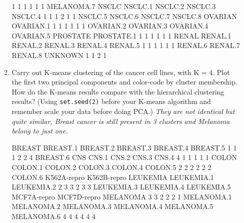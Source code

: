 \documentclass[12pt,a4paper]{paper}
\begin{document}
\begin{enumerate}
\begin{enumerate}
\begin{Schunk}
\begin{Soutput}
          1           1           1           1           1           1 
 MELANOMA.7       NSCLC     NSCLC.1     NSCLC.2     NSCLC.3     NSCLC.4 
          1           1           1           2           1           1 
    NSCLC.5     NSCLC.6     NSCLC.7     NSCLC.8     OVARIAN   OVARIAN.1 
          1           1           1           1           1           1 
  OVARIAN.2   OVARIAN.3   OVARIAN.4   OVARIAN.5    PROSTATE  PROSTATE.1 
          1           1           1           1           1           1 
      RENAL     RENAL.1     RENAL.2     RENAL.3     RENAL.4     RENAL.5 
          1           1           1           1           1           1 
    RENAL.6     RENAL.7     RENAL.8     UNKNOWN 
          1           1           2           1 
\end{Soutput}
\end{Schunk}
\item Carry out K-means clustering of the cancer cell lines, with K = 4. Plot the first two principal components and color-code by cluster membership. How do the K-means results compare with the hierarchical clustering results? (Using \texttt{set.seed(2)} before your K-means algorithm and remember scale your data before doing PCA.) \textit{They are not identical but quite similar, Breast cancer is still present in 3 clusters and Melanoma belong to just one.}
\begin{Schunk}
\begin{Soutput}
     BREAST    BREAST.1    BREAST.2    BREAST.3    BREAST.4    BREAST.5 
          1           1           1           2           2           4 
   BREAST.6         CNS       CNS.1       CNS.2       CNS.3       CNS.4 
          4           1           1           1           1           1 
      COLON     COLON.1     COLON.2     COLON.3     COLON.4     COLON.5 
          2           2           2           2           2           2 
    COLON.6 K562A-repro K562B-repro    LEUKEMIA  LEUKEMIA.1  LEUKEMIA.2 
          2           3           3           2           3           3 
 LEUKEMIA.3  LEUKEMIA.4  LEUKEMIA.5 MCF7A-repro MCF7D-repro    MELANOMA 
          3           3           2           2           2           1 
 MELANOMA.1  MELANOMA.2  MELANOMA.3  MELANOMA.4  MELANOMA.5  MELANOMA.6 
          4           4           4           4           4           4 

\end{Soutput}
\end{Schunk}
\end{enumerate}
\end{enumerate}
\end{document}
